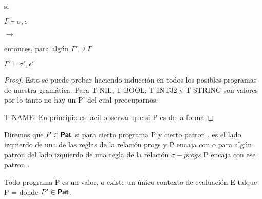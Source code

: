 \begin{theorem}[Preservacion]
    si


    $\Gamma \vdash \sigma, \epsilon$

      $\rightarrow$ 

    entonces, para algún $\Gamma' \supseteq  \Gamma$


    $\Gamma' \vdash \sigma', \epsilon'$

\end{theorem}

\begin{proof}
Esto se puede probar haciendo inducción en todos los posibles programas de nuestra
gramática. Para T-NIL, T-BOOL, T-INT32 y T-STRING son valores por lo tanto no hay un P' del cual preocuparnos.

T-NAME: En principio es fácil observar que si P es de la forma  
\end{proof}

\begin{definition}
    Diremos que $P \in \textsf{\textbf{Pat}}$ si para cierto programa P y cierto patron .  es el lado izquierdo de una de las reglas de la relación progs y P encaja con 
    o para algún patron  del lado izquierdo de una regla de la relación $\sigma-progs$ P encaja con ese patron .
\end{definition}

\begin{lemma}
    Todo programa P es un valor, o existe un único contexto de evaluación E talque 
    P =  donde $P' \in \textsf{\textbf{Pat}}$.
\end{lemma}

